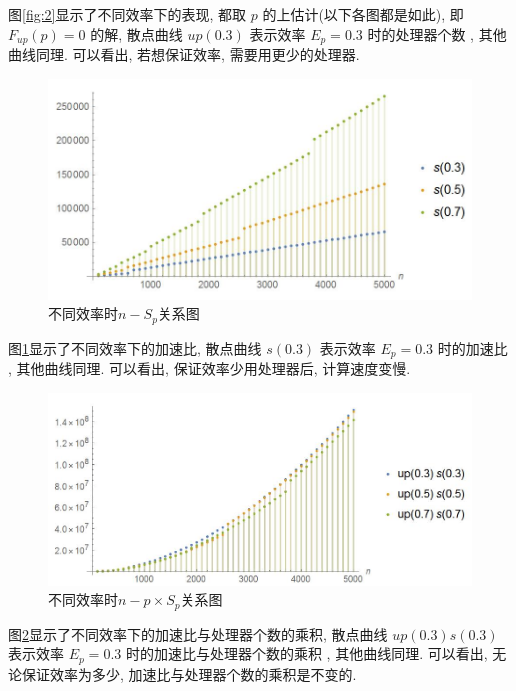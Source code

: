\documentclass[a4paper, UTF8]{ctexart}				%
\numberwithin{equation}{section}				%
\begin{document}
        图\ref{fig:2}显示了不同效率下的表现, 都取 $p$ 的上估计(以下各图都是如此), 即  $F_{up}(p) = 0$ 的解, 散点曲线 $up(0.3)$ 表示效率 $E_p = 0.3$ 时的处理器个数 , 其他曲线同理. 可以看出, 若想保证效率, 需要用更少的处理器.\newpage

        \begin{figure}[h]\small\centering
            \includegraphics[width=12cm]{3.jpg}\caption{不同效率时$n-S_p$关系图}\label{fig:3}
        \end{figure}

        图\ref{fig:3}显示了不同效率下的加速比, 散点曲线 $s(0.3)$ 表示效率 $E_p = 0.3$ 时的加速比 , 其他曲线同理. 可以看出, 保证效率少用处理器后, 计算速度变慢.

        \begin{figure}[h]\small\centering
            \includegraphics[width=12cm]{4.jpg}\caption{不同效率时$n-p\times S_p$关系图}\label{fig:4}
        \end{figure}

        图\ref{fig:4}显示了不同效率下的加速比与处理器个数的乘积, 散点曲线 $up(0.3)s(0.3)$ 表示效率 $E_p = 0.3$ 时的加速比与处理器个数的乘积 , 其他曲线同理. 可以看出, 无论保证效率为多少, 加速比与处理器个数的乘积是不变的.
\end{document}

